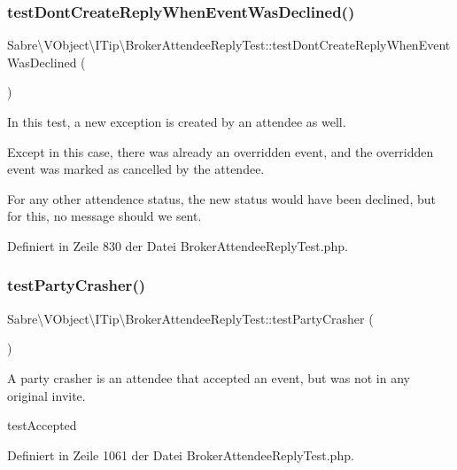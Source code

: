 \subsubsection{\texorpdfstring{test\+Dont\+Create\+Reply\+When\+Event\+Was\+Declined()}{testDontCreateReplyWhenEventWasDeclined()}}
{\footnotesize\ttfamily Sabre\textbackslash{}\+V\+Object\textbackslash{}\+I\+Tip\textbackslash{}\+Broker\+Attendee\+Reply\+Test\+::test\+Dont\+Create\+Reply\+When\+Event\+Was\+Declined (\begin{DoxyParamCaption}{ }\end{DoxyParamCaption})}

In this test, a new exception is created by an attendee as well.

Except in this case, there was already an overridden event, and the overridden event was marked as cancelled by the attendee.

For any other attendence status, the new status would have been declined, but for this, no message should we sent. 

Definiert in Zeile 830 der Datei Broker\+Attendee\+Reply\+Test.\+php.

\mbox{\label{class_sabre_1_1_v_object_1_1_i_tip_1_1_broker_attendee_reply_test_a666795eaa0113d9692970b93d5524757}} 
\subsubsection{\texorpdfstring{test\+Party\+Crasher()}{testPartyCrasher()}}
{\footnotesize\ttfamily Sabre\textbackslash{}\+V\+Object\textbackslash{}\+I\+Tip\textbackslash{}\+Broker\+Attendee\+Reply\+Test\+::test\+Party\+Crasher (\begin{DoxyParamCaption}{ }\end{DoxyParamCaption})}

A party crasher is an attendee that accepted an event, but was not in any original invite.

test\+Accepted 

Definiert in Zeile 1061 der Datei Broker\+Attendee\+Reply\+Test.\+php.

